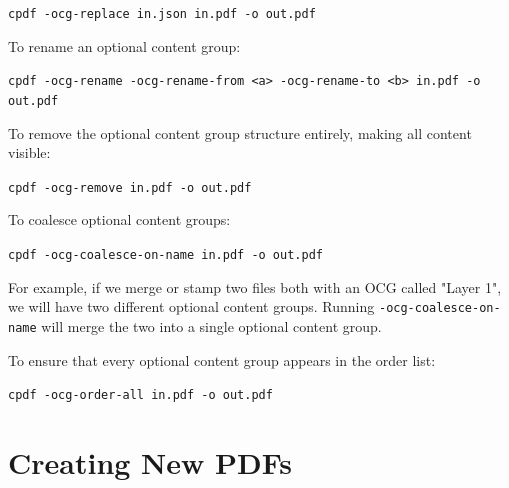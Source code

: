 \documentclass{book}
\begin{document}
  {\small\begin{framed}
  \noindent\verb!cpdf -ocg-replace in.json in.pdf -o out.pdf!
  \end{framed}}
  
\noindent To rename an optional content group:

  {\small\begin{framed}
  \noindent\verb!cpdf -ocg-rename -ocg-rename-from <a> -ocg-rename-to <b> in.pdf -o out.pdf!
  \end{framed}}

\noindent To remove the optional content group structure entirely, making all content visible:

  {\small\begin{framed}
  \noindent\verb!cpdf -ocg-remove in.pdf -o out.pdf!
  \end{framed}}

\noindent To coalesce optional content groups: 

  {\small\begin{framed}
  \noindent\verb!cpdf -ocg-coalesce-on-name in.pdf -o out.pdf!
  \end{framed}}

\noindent For example, if we merge or stamp two files both with an OCG called "Layer 1", we will have two different optional content groups. Running \texttt{-ocg-coalesce-on-name} will merge the two into a single optional content group.

To ensure that every optional content group appears in the order list:

  {\small\begin{framed}
  \noindent\verb!cpdf -ocg-order-all in.pdf -o out.pdf!
  \end{framed}}

\clearpage\pagestyle{empty}
\chapter{Creating New PDFs}\label{chap:17}\pagestyle{fancy}
\end{document}
